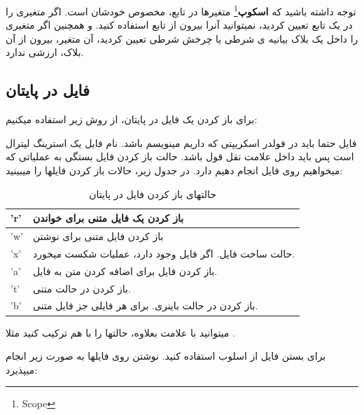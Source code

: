 \documentclass[14pt,a4paper]{memoir}
\begin{document}
	 \begin{tip}
	 	توجه داشته باشید که \textbf{اسکوپ}\footnote{Scope} متغیرها در تابع، مخصوص خودشان است. اگر متغیری را در یک تابع تعیین کردید، نمیتوانید آنرا بیرون از تابع استفاده کنید. و همچنین اگر متغیری را داخل یک بلاک بیانیه ی شرطی یا چرخش شرطی تعیین کردید، آن متغیر، بیرون از آن بلاک، ارزشی ندارد.
	 \end{tip}	 
	 
	 
	 \subsection{فایل در پایتان}\label{pyfile}
	 برای باز کردن یک فایل در پایتان، از روش زیر استفاده میکنیم:
	 
	 
	 
	 	 \begin{latin}
	 	
	 \end{latin}
 
 فایل حتما باید در فولدر اسکریپتی که داریم مینویسم باشد. نام فایل یک استرینگ لیترال است پس باید داخل علامت نقل قول باشد. حالت باز کردن فایل بستگی به عملیاتی که میخواهیم روی فایل انجام دهیم دارد. در جدول زیر، حالات باز کردن فایلها را میبینید:
 
\begin{table}[H]
	\begin{tabular}{|l|l|}
		\hline
		'r' & باز کردن یک فایل متنی برای خواندن                       \\ \hline
		'w' & باز کردن فایل متنی برای نوشتن                           \\ \hline
		'x' & حالت ساخت فایل. اگر فایل وجود دارد، عملیات شکست میخورد. \\ \hline
		'a' & باز کردن فایل برای اضافه کردن متن به فایل.              \\ \hline
		't' & باز کردن در حالت متنی.                                  \\ \hline
		'b' & باز کردن در حالت باینری. برای هر فایلی جز فایل متنی.    \\ \hline
	\end{tabular}
\caption{حالتهای باز کردن فایل در پایتان}
\end{table}
	 
	 میتوانید با علامت بعلاوه، حالتها را با هم ترکیب کنید مثلا .
	 
	 برای بستن فایل از اسلوب  استفاده کنید. نوشتن روی فایلها به صورت زیر انجام میپذیرد:
	 
\end{document}
